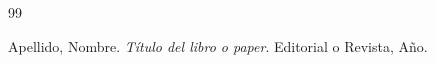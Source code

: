 \documentclass[12pt,a4paper]{article}
\begin{document}
\renewcommand{\refname}{Bibliografía}
\begin{thebibliography}{99}

Apellido, Nombre. \textit{Título del libro o paper}. Editorial o Revista, Año.

\end{thebibliography}
\end{document}
